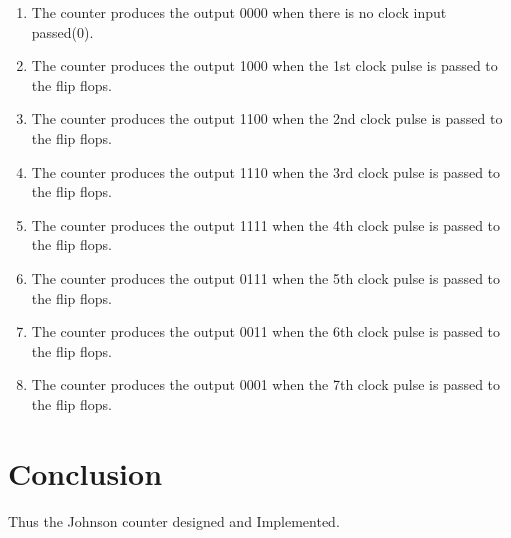 \documentclass[journal,12pt,twocolumn]{IEEEtran}
\begin{document}
 \begin{enumerate}
 
\item The counter produces the output 0000 when there is no clock input passed(0).
\item  The counter produces the output 1000 when the 1st clock pulse is passed to the flip flops.
 \item  The counter produces the output 1100 when the 2nd clock pulse is passed to the flip flops. \item The counter produces the output 1110 when the 3rd clock pulse is passed to the flip flops.
\item The counter produces the output 1111 when the 4th clock pulse is  passed to the flip flops.
\item  The counter produces the output 0111 when the 5th clock pulse is passed to the flip flops.
\item The counter produces the output 0011 when the 6th clock pulse is passed to the flip flops.
\item The counter produces the output 0001 when the 7th clock pulse is passed to the flip flops.
 \end{enumerate}
 
 
 \section*{Conclusion}
 Thus the Johnson counter designed and Implemented.
\end{document}

